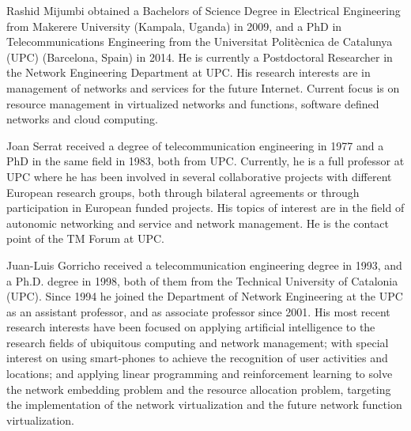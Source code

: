 \documentclass[journal]{IEEEtran}
\begin{document}



\newpage
\begin{IEEEbiography}
{Rashid Mijumbi}
obtained a Bachelors of Science Degree in Electrical Engineering from Makerere University (Kampala, Uganda) in 2009, and a PhD in Telecommunications Engineering from the Universitat Polit\`{e}cnica de Catalunya (UPC) (Barcelona, Spain) in 2014. He is currently a Postdoctoral Researcher in the Network Engineering Department at UPC. His research interests are in management of networks and services for the future Internet. Current focus is on resource management in virtualized networks and functions, software defined networks and cloud computing.
\end{IEEEbiography}

\begin{IEEEbiography}
{Joan Serrat}
received a degree of telecommunication engineering in 1977 and a PhD in the same field in 1983, both from UPC. Currently, he is a full professor at UPC where he has been involved in several collaborative projects with different European research groups, both through bilateral agreements or through participation in European funded projects. His topics of interest are in the field of autonomic networking and service and network management. He is the contact point of the TM Forum at UPC.
\end{IEEEbiography}

\begin{IEEEbiography}
{Juan-Luis Gorricho}
received a telecommunication engineering degree in 1993, and a Ph.D. degree in 1998, both of them from the Technical University of Catalonia (UPC). Since 1994 he joined the Department of Network Engineering at the UPC as an assistant professor, and as associate professor since 2001. His most recent research interests have been focused on applying artificial intelligence to the research fields of ubiquitous computing and network management; with special interest on using smart-phones to achieve the recognition of user activities and locations; and applying linear programming and reinforcement learning to solve the network embedding problem and the resource allocation problem, targeting the implementation of the network virtualization and the future network function virtualization.
\end{IEEEbiography}
\end{document}
